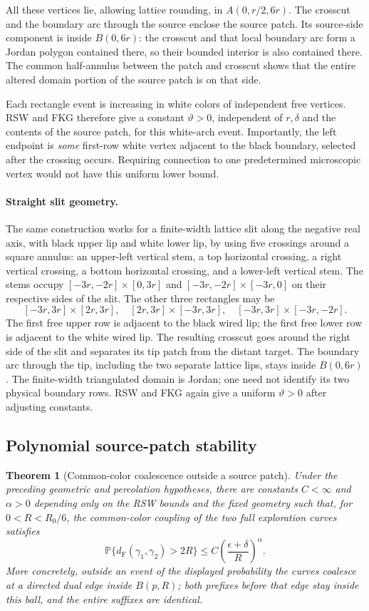 \documentclass[11pt]{article}
\newtheorem{theorem}{Theorem}[section]
\theoremstyle{definition}\newtheorem{definition}[theorem]{Definition}
\theoremstyle{remark}\newtheorem{remark}[theorem]{Remark}
\begin{document}
All these vertices lie, allowing lattice rounding, in
$A(0,r/2,6r)$. The crosscut and the boundary arc through the source
enclose the source patch. Its source-side component is inside $B(0,6r)$:
the crosscut and that local boundary arc form a Jordan polygon contained
there, so their bounded interior is also contained there. The common
half-annulus between the patch and crosscut shows that the entire altered
domain portion of the source patch is on that side.

Each rectangle event is increasing in white colors of independent free
vertices. RSW and FKG therefore give a constant $\vartheta>0$, independent
of $r,\delta$ and the contents of the source patch, for this white-arch
event. Importantly, the left endpoint is \emph{some} first-row white vertex
adjacent to the black boundary, selected after the crossing occurs. Requiring
connection to one predetermined microscopic vertex would not have this
uniform lower bound.

\paragraph{Straight slit geometry.}
The same construction works for a finite-width lattice slit along the
negative real axis, with black upper lip and white lower lip, by using
five crossings around a square annulus: an upper-left vertical stem,
a top horizontal crossing, a right vertical crossing, a bottom horizontal
crossing, and a lower-left vertical stem. The stems occupy
$[-3r,-2r]\times[0,3r]$ and
$[-3r,-2r]\times[-3r,0]$ on their respective sides of the slit.
The other three rectangles may be
\[
 [-3r,3r]\times[2r,3r],\quad
 [2r,3r]\times[-3r,3r],\quad
 [-3r,3r]\times[-3r,-2r].
\]
The first free upper row is adjacent to the black wired lip; the first
free lower row is adjacent to the white wired lip. The resulting crosscut
goes around the right side of the slit and separates its tip patch from
the distant target. The boundary arc through the tip, including the two
separate lattice lips, stays inside $B(0,6r)$. The finite-width triangulated
domain is Jordan; one need not identify its two physical boundary rows.
RSW and FKG again give a uniform $\vartheta>0$ after adjusting constants.

\subsection{Polynomial source-patch stability}

\begin{theorem}[Common-color coalescence outside a source patch]
\label{thm:ss-coalescence}
Under the preceding geometric and percolation hypotheses, there are
constants $C<\infty$ and $\alpha>0$ depending only on the RSW bounds and
the fixed geometry such that, for $0<R<R_0/6$, the common-color coupling
of the two full exploration curves satisfies
\[
 \mathbb P\{d_{\mathrm F}(\gamma_1,\gamma_2)>2R\}
       \leq C\left(\frac{\epsilon+\delta}{R}\right)^\alpha.
 \tag{SH1}
\]
More concretely, outside an event of the displayed probability the curves
coalesce at a directed dual edge inside $B(p,R)$; both prefixes before
that edge stay inside this ball, and the entire suffixes are identical.
\end{theorem}
\end{document}
